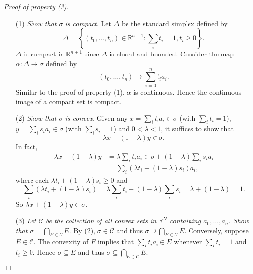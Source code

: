 \documentclass{article}
\begin{document}
\emph{Proof of property (3).}
\begin{enumerate}
\item[(1)]
  \emph{Show that $\sigma$ is compact.}
  Let $\Delta$ be the standard simplex defined by
  \[
    \Delta
    =
    \left\{ (t_0, \ldots, t_n) \in \mathbb{R}^{n+1} : \sum_i t_i = 1, t_i \geq 0 \right\}.
  \]
  $\Delta$ is compact in $\mathbb{R}^{n+1}$ since $\Delta$ is closed and bounded.
  Consider the map $\alpha: \Delta \to \sigma$ defined by
  \[
     (t_0, \ldots, t_n) \mapsto \sum_{i=0}^{n} t_i a_i.
  \]
  Similar to the proof of property (1), $\alpha$ is continuous.
  Hence the continuous image of a compact set is compact.

\item[(2)]
  \emph{Show that $\sigma$ is convex.}
  Given any
  $x = \sum_i t_i a_i \in \sigma$ (with $\sum_i t_i = 1$),
  $y = \sum_i s_i a_i \in \sigma$ (with $\sum_i s_i = 1$) and $0 < \lambda < 1$,
  it suffices to show that
  \[
    \lambda x + (1-\lambda) y \in \sigma.
  \]
  In fact,
  \begin{align*}
    \lambda x + (1-\lambda) y
    &= \lambda \sum_i t_i a_i \in \sigma + (1-\lambda) \sum_i s_i a_i \\
    &= \sum_i (\lambda t_i + (1-\lambda) s_i) a_i,  
  \end{align*}
  where each $\lambda t_i + (1-\lambda) s_i \geq 0$
  and
  \[
    \sum_i (\lambda t_i + (1-\lambda) s_i)
    = \lambda \sum_i t_i + (1-\lambda) \sum_i s_i
    = \lambda + (1-\lambda)
    = 1.
  \]
  So $\lambda x + (1-\lambda) y \in \sigma$.

\item[(3)]
  \emph{Let $\mathscr{C}$ be the collection
  of all convex sets in $\mathbb{R}^N$ containing $a_0, \ldots, a_n$.
  Show that $\sigma = \bigcap_{E \in \mathscr{C}} E$.}
  By (2), $\sigma \in \mathscr{C}$ and thus $\sigma \supseteq \bigcap_{E \in \mathscr{C}} E$.
  Conversely, suppose $E \in \mathscr{C}$.
  The convexity of $E$ implies that
  $\sum_i t_i a_i \in E$ whenever $\sum_i t_i = 1$ and  $t_i \geq 0$.
  Hence $\sigma \subseteq E$ and thus $\sigma \subseteq \bigcap_{E \in \mathscr{C}} E$.
\end{enumerate}
$\Box$ \\\\



\end{document}
